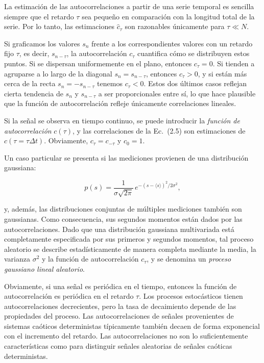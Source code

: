\documentclass[10pt,a4paper]{book}
\begin{document}
La estimación de las autocorrelaciones a partir de una serie temporal es sencilla siempre que el retardo $\tau$ sea pequeño en comparación con la longitud total de la serie. Por lo tanto, las estimaciones $\hat{c}_\tau$ son razonables únicamente para $\tau \ll N$.  

Si graficamos los valores $s_n$ frente a los correspondientes valores con un retardo fijo $\tau$, es decir, $s_{n-\tau}$, la autocorrelación $c_\tau$ cuantifica cómo se distribuyen estos puntos. Si se dispersan uniformemente en el plano, entonces $c_\tau = 0$. Si tienden a agruparse a lo largo de la diagonal $s_n = s_{n-\tau}$, entonces $c_\tau > 0$, y si están más cerca de la recta $s_n = -s_{n-\tau}$ tenemos $c_\tau < 0$. Estos dos últimos casos reflejan cierta tendencia de $s_n$ y $s_{n-\tau}$ a ser proporcionales entre sí, lo que hace plausible que la función de autocorrelación refleje únicamente correlaciones lineales.

Si la señal se observa en tiempo continuo, se puede introducir la \emph{función de autocorrelación} $c(\tau)$, y las correlaciones de la Ec.~(2.5) son estimaciones de $c(\tau = \tau \Delta t)$. Obviamente, $c_{\tau} = c_{-\tau}$ y $c_0 = 1$.

Un caso particular se presenta si las mediciones provienen de una distribución gaussiana:

\begin{equation}
p(s) = \frac{1}{\sigma \sqrt{2\pi}} \, e^{-(s - \langle s \rangle)^2 / 2\sigma^2},
\tag{2.6}
\end{equation}

y, además, las distribuciones conjuntas de múltiples mediciones también son gaussianas. Como consecuencia, sus segundos momentos están dados por las autocorrelaciones. Dado que una distribución gaussiana multivariada está completamente especificada por sus primeros y segundos momentos, tal proceso aleatorio se describe estadísticamente de manera completa mediante la media, la varianza $\sigma^2$ y la función de autocorrelación $c_\tau$, y se denomina un \emph{proceso gaussiano lineal aleatorio}.

Obviamente, si una señal es periódica en el tiempo, entonces la función de autocorrelación es periódica en el retardo $\tau$. Los procesos estocásticos tienen autocorrelaciones decrecientes, pero la tasa de decaimiento depende de las propiedades del proceso. Las autocorrelaciones de señales provenientes de sistemas caóticos deterministas típicamente también decaen de forma exponencial con el incremento del retardo. Las autocorrelaciones no son lo suficientemente características como para distinguir señales aleatorias de señales caóticas deterministas.
\end{document}
